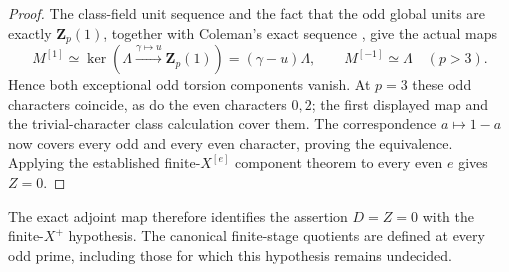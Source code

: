 \begin{proof}
The class-field unit sequence and the fact that the
odd global units are exactly $\mathbf Z_p(1)$,
together with Coleman's exact sequence
\cite[Theorem~5.5.31, p.~148]{SharifiIwa}, give the
actual maps
\[
 M^{[1]}\simeq\ker(\Lambda\xrightarrow{\gamma\mapsto u}
                \mathbf Z_p(1))=(\gamma-u)\Lambda,
 \qquad M^{[-1]}\simeq\Lambda\quad(p>3).
\]
Hence both exceptional odd torsion components vanish.
At $p=3$ these odd characters coincide, as do the
even characters $0,2$; the first displayed map and
the trivial-character class calculation cover them.
The correspondence $a\mapsto1-a$ now covers every
odd and every even character, proving the equivalence.
Applying the established finite-$X^{[e]}$ component
theorem to every even $e$ gives $Z=0$.
\end{proof}

The exact adjoint map therefore identifies the assertion
$D=Z=0$ with the finite-$X^+$ hypothesis. The canonical
finite-stage quotients are defined at every odd prime,
including those for which this hypothesis remains undecided.
